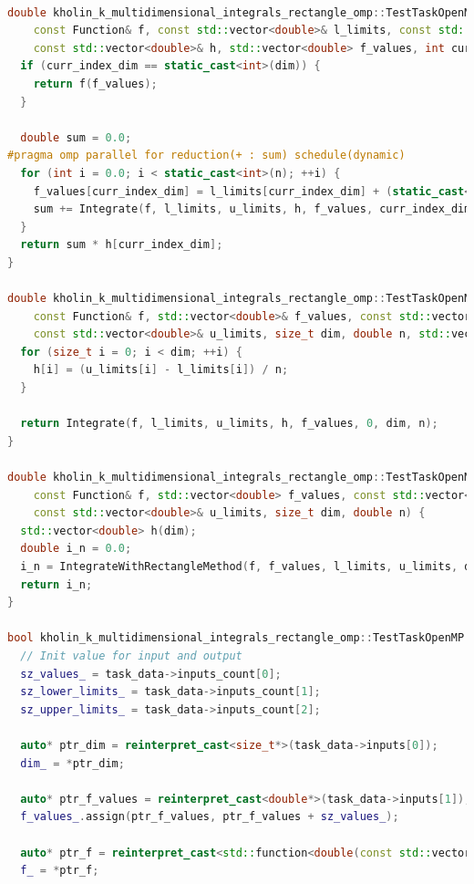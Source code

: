 \documentclass[14pt,a4paper]{article}
\begin{document}
\begin{framed}
\begin{lstlisting}[language=C++]

double kholin_k_multidimensional_integrals_rectangle_omp::TestTaskOpenMP::Integrate(
    const Function& f, const std::vector<double>& l_limits, const std::vector<double>& u_limits,
    const std::vector<double>& h, std::vector<double> f_values, int curr_index_dim, size_t dim, double n) {
  if (curr_index_dim == static_cast<int>(dim)) {
    return f(f_values);
  }

  double sum = 0.0;
#pragma omp parallel for reduction(+ : sum) schedule(dynamic)
  for (int i = 0.0; i < static_cast<int>(n); ++i) {
    f_values[curr_index_dim] = l_limits[curr_index_dim] + (static_cast<double>(i) + 0.5) * h[curr_index_dim];
    sum += Integrate(f, l_limits, u_limits, h, f_values, curr_index_dim + 1, dim, n);
  }
  return sum * h[curr_index_dim];
}

double kholin_k_multidimensional_integrals_rectangle_omp::TestTaskOpenMP::IntegrateWithRectangleMethod(
    const Function& f, std::vector<double>& f_values, const std::vector<double>& l_limits,
    const std::vector<double>& u_limits, size_t dim, double n, std::vector<double> h) {
  for (size_t i = 0; i < dim; ++i) {
    h[i] = (u_limits[i] - l_limits[i]) / n;
  }

  return Integrate(f, l_limits, u_limits, h, f_values, 0, dim, n);
}

double kholin_k_multidimensional_integrals_rectangle_omp::TestTaskOpenMP::RunMultistepSchemeMethodRectangle(
    const Function& f, std::vector<double> f_values, const std::vector<double>& l_limits,
    const std::vector<double>& u_limits, size_t dim, double n) {
  std::vector<double> h(dim);
  double i_n = 0.0;
  i_n = IntegrateWithRectangleMethod(f, f_values, l_limits, u_limits, dim, n, h);
  return i_n;
}

bool kholin_k_multidimensional_integrals_rectangle_omp::TestTaskOpenMP::PreProcessingImpl() {
  // Init value for input and output
  sz_values_ = task_data->inputs_count[0];
  sz_lower_limits_ = task_data->inputs_count[1];
  sz_upper_limits_ = task_data->inputs_count[2];

  auto* ptr_dim = reinterpret_cast<size_t*>(task_data->inputs[0]);
  dim_ = *ptr_dim;

  auto* ptr_f_values = reinterpret_cast<double*>(task_data->inputs[1]);
  f_values_.assign(ptr_f_values, ptr_f_values + sz_values_);

  auto* ptr_f = reinterpret_cast<std::function<double(const std::vector<double>&)>*>(task_data->inputs[2]);
  f_ = *ptr_f;


\end{lstlisting}
\end{framed}
\end{document}
